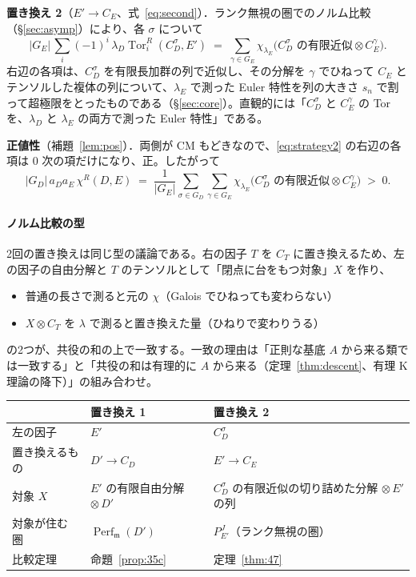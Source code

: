 \documentclass[11pt,a4paper]{ltjsarticle}
\numberwithin{equation}{section}
\theoremstyle{plain}
\theoremstyle{definition}
\theoremstyle{definition}
\newcommand{\m}{\mathfrak{m}}
\newcommand{\Tor}{\operatorname{Tor}}
\newcommand{\Perf}{\operatorname{Perf}}
\begin{document}
\textbf{置き換え 2}（$E'\to C_E$、式~\eqref{eq:second}）．ランク無視の圏でのノルム比較（§\ref{sec:asymp}）により、各 $\sigma$ について
\begin{equation}\label{eq:strategy2}
  |G_E|\, \sum_i (-1)^i\, \lambda_D \Tor_i^R(C_D^\sigma, E') \;=\; \sum_{\gamma\in G_E} \chi_{\lambda_E}\bigl(\text{$C_D^\sigma$ の有限近似} \otimes C_E^\gamma\bigr).
\end{equation}
右辺の各項は、$C_D^\sigma$ を有限長加群の列で近似し、その分解を $\gamma$ でひねって $C_E$ とテンソルした複体の列について、$\lambda_E$ で測った Euler 特性を列の大きさ $s_n$ で割って超極限をとったものである（§\ref{sec:core}）。直観的には「$C_D^\sigma$ と $C_E^\gamma$ の Tor を、$\lambda_D$ と $\lambda_E$ の両方で測った Euler 特性」である。

\textbf{正値性}（補題~\ref{lem:pos}）．両側が CM もどきなので、\eqref{eq:strategy2} の右辺の各項は $0$ 次の項だけになり、正。したがって
\[
  |G_D|\, a_D a_E\, \chi^R(D,E) \;=\; \frac{1}{|G_E|}\sum_{\sigma\in G_D}\sum_{\gamma\in G_E} \chi_{\lambda_E}\bigl(\text{$C_D^\sigma$ の有限近似} \otimes C_E^\gamma\bigr) \;>\; 0.
\]

\paragraph{ノルム比較の型}
2回の置き換えは同じ型の議論である。右の因子 $T$ を $C_T$ に置き換えるため、左の因子の自由分解と $T$ のテンソルとして「閉点に台をもつ対象」$X$ を作り、
\begin{itemize}
  \item 普通の長さで測ると元の $\chi$（Galois でひねっても変わらない）
  \item $X\otimes C_T$ を $\lambda$ で測ると置き換えた量（ひねりで変わりうる）
\end{itemize}
の2つが、共役の和の上で一致する。一致の理由は「正則な基底 $A$ から来る類では一致する」と「共役の和は有理的に $A$ から来る（定理~\ref{thm:descent}、有理 K 理論の降下）」の組み合わせ。

\begin{center}
\begin{tabularx}{\textwidth}{>{\raggedright}p{3cm}>{\raggedright}X>{\raggedright\arraybackslash}X}
\toprule
 & 置き換え 1 & 置き換え 2 \\
\midrule
左の因子 & $E'$ & $C_D^\sigma$ \\
置き換えるもの & $D' \to C_D$ & $E' \to C_E$ \\
対象 $X$ & $E'$ の有限自由分解 $\otimes\, D'$ & $C_D^\sigma$ の有限近似の切り詰めた分解 $\otimes\, E'$ の列 \\
対象が住む圏 & $\Perf_{\m}(D')$ & $P_{E'}^J$（ランク無視の圏） \\
比較定理 & 命題~\ref{prop:35c} & 定理~\ref{thm:47} \\
\bottomrule
\end{tabularx}
\end{center}
\end{document}
